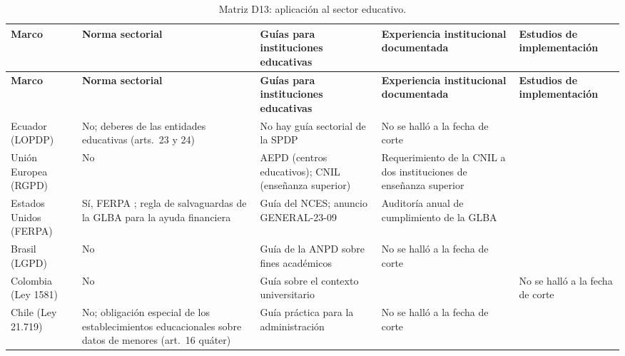 {\scriptsize
\renewcommand{\arraystretch}{1.12}
\begin{xltabular}{\textwidth}{|>{\raggedright\arraybackslash}p{2.0cm}|L|L|L|L|}
  \caption{Matriz D13: aplicación al sector educativo.}
  \label{tab:matriz_d13} \\
  \hline
  \textbf{Marco} & \textbf{Norma sectorial} & \textbf{Guías para instituciones educativas} & \textbf{Experiencia institucional documentada} & \textbf{Estudios de implementación} \\
  \hline
  \endfirsthead
  \hline
  \textbf{Marco} & \textbf{Norma sectorial} & \textbf{Guías para instituciones educativas} & \textbf{Experiencia institucional documentada} & \textbf{Estudios de implementación} \\
  \hline
  \endhead
  \hline
  \endlastfoot
  Ecuador (LOPDP) & No; deberes de las entidades educativas (arts.~23 y 24) & No hay guía sectorial de la SPDP & No se halló a la fecha de corte & \cite{alvarez2024proteccion,piray2026garantias,mora2024lms} \\ \hline
  Unión Europea (RGPD) & No & AEPD (centros educativos); CNIL (enseñanza superior) \cite{aepd2018centros,cnil2026superieur} & Requerimiento de la CNIL a dos instituciones de enseñanza superior \cite{cnil2023miseendemeure} & \cite{fpf2020gdpr,habbabeh2019assessment} \\ \hline
  Estados Unidos (FERPA) & Sí, FERPA \cite{ferpa1974}; regla de salvaguardas de la GLBA para la ayuda financiera \cite{ftc2021safeguards} & Guía del NCES; anuncio GENERAL-23-09 \cite{nces2004privacy,fsa2023glba} & Auditoría anual de cumplimiento de la GLBA \cite{fsa2023glba} & \cite{parks2017ferpa} \\ \hline
  Brasil (LGPD) & No & Guía de la ANPD sobre fines académicos \cite{anpd2023academicos} & No se halló a la fecha de corte & \cite{almeida2024lgpd} \\ \hline
  Colombia (Ley 1581) & No & Guía sobre el contexto universitario \cite{sic2026universitario} & \cite{correa2024rosario} & No se halló a la fecha de corte \\ \hline
  Chile (Ley 21.719) & No; obligación especial de los establecimientos educacionales sobre datos de menores (art.~16 quáter) & Guía práctica para la administración \cite{chile2026guia} & No se halló a la fecha de corte & \cite{riveros2025grupos,guerrero2021proctoring} \\ \hline
\end{xltabular}
}
{\raggedright{}\par}

